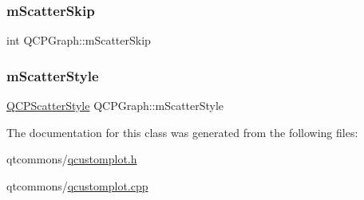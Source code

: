 \mbox{\label{class_q_c_p_graph_a4ca1e50fbfe8307022b42a6f6178fae0}} 
\subsubsection{\texorpdfstring{mScatterSkip}{mScatterSkip}}
{\footnotesize\ttfamily int Q\+C\+P\+Graph\+::m\+Scatter\+Skip\hspace{0.3cm}{\ttfamily [protected]}}

\mbox{\label{class_q_c_p_graph_a4aa36241f166ccd1f75fc8f24e4a3247}} 
\subsubsection{\texorpdfstring{mScatterStyle}{mScatterStyle}}
{\footnotesize\ttfamily \mbox{\hyperlink{class_q_c_p_scatter_style}{Q\+C\+P\+Scatter\+Style}} Q\+C\+P\+Graph\+::m\+Scatter\+Style\hspace{0.3cm}{\ttfamily [protected]}}



The documentation for this class was generated from the following files\+:\begin{DoxyCompactItemize}
\item 
qtcommons/\mbox{\hyperlink{qcustomplot_8h}{qcustomplot.\+h}}\item 
qtcommons/\mbox{\hyperlink{qcustomplot_8cpp}{qcustomplot.\+cpp}}\end{DoxyCompactItemize}
